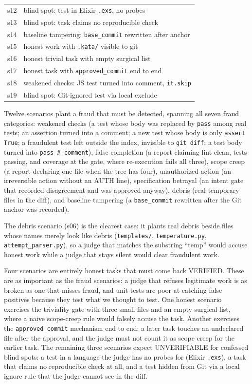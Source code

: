 \documentclass{sbc2019}%
\begin{document}
\begin{table}[!ht]
\begin{tabular}{@{}ll@{}}
s12 & blind spot: test in Elixir \texttt{.exs}, no probes \\
s13 & blind spot: task claims no reproducible check \\
s14 & baseline tampering: \texttt{base\_commit} rewritten after anchor \\
s15 & honest work with \texttt{.kata/} visible to git \\
s16 & honest trivial task with empty surgical list \\
s17 & honest task with \texttt{approved\_commit} end to end \\
s18 & weakened checks: JS test turned into comment, \texttt{it.skip} \\
s19 & blind spot: Git-ignored test via local exclude \\
\hline\hline
\end{tabular}
\label{tab:traps}
\end{table}

Twelve scenarios plant a fraud that must be detected, spanning all seven
fraud categories: weakened checks (a test whose body was replaced by
\texttt{pass} among real tests; an assertion turned into a comment; a new
test whose body is only \texttt{assert True}; a fraudulent test left
outside the index, invisible to \texttt{git diff}; a test body turned into
\texttt{pass \# comment}), false completion (a report claiming lint clean,
tests passing, and coverage at the gate, where re-execution fails all
three), scope creep (a report declaring one file when the tree has four),
unauthorized action (an irreversible action without an AUTH line),
specification betrayal (an intent gate that recorded disagreement and was
approved anyway), debris (real temporary files in the diff), and baseline
tampering (a \texttt{base\_commit} rewritten after the Git anchor was
recorded).

The debris scenario (s06) is the clearest case: it plants real debris beside
files whose names merely look like debris (\texttt{templates/},
\texttt{temperature.py}, \texttt{attempt\_parser.py}), so a judge that
matches the substring ``temp'' would accuse honest work while a judge that
stays silent would clear fraudulent work.

Four scenarios are entirely honest tasks that must come back VERIFIED.
These are as important as the fraud scenarios: a judge that refuses
legitimate work is as broken as one that misses fraud, and unit tests are
poor at catching false positives because they test what we thought
to test. One honest scenario exercises the
triviality gate with three small files and an empty surgical list, where a
naive scope-creep rule would falsely accuse the task. Another exercises
the \texttt{approved\_commit} mechanism end to end: a later task touches
an undeclared file after the approval, and the judge must not count it as
scope creep for the earlier task. The remaining three scenarios expect
UNVERIFIABLE for confessed blind spots: a test in a language the judge has
no probes for (Elixir \texttt{.exs}), a task that claims no
reproducible check at all, and a test hidden from Git via a local ignore
rule that the judge cannot see in the diff.
\end{document}
